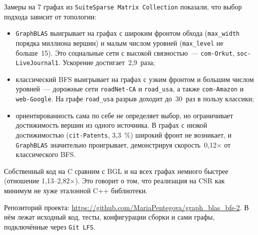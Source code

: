 \documentclass[a4paper]{article}
\begin{document}
Замеры на 7 графах из \texttt{SuiteSparse Matrix Collection} показали, что выбор подхода зависит от топологии:
\begin{itemize}
    \item \texttt{GraphBLAS} выигрывает на графах с широким фронтом обхода (\texttt{max\_width} порядка миллиона вершин) и малым числом уровней (\texttt{max\_level} не больше~15). Это социальные сети с высокой связностью~--- \texttt{com-Orkut}, \texttt{soc-LiveJournal1}. Ускорение достигает~2,9~раза;
    \item классический BFS выигрывает на графах с узким фронтом и большим числом уровней~--- дорожные сети \texttt{roadNet-CA} и \texttt{road\_usa}, а также \texttt{com-Amazon} и \texttt{web-Google}. На графе \texttt{road\_usa} разрыв доходит до~30~раз в пользу классики;
    \item ориентированность сама по себе не определяет выбор, но ограничивает достижимость вершин из одного источника. В графах с низкой достижимостью (\texttt{cit-Patents}, 3,3~{\%}) широкий фронт не возникает, и \texttt{GraphBLAS} значительно проигрывает, демонстрируя скорость~0,12$\times$ от классического BFS.
\end{itemize}

Собственный код на C сравним с BGL и на всех графах немного быстрее (отношение 1,13--2,82$\times$). Это говорит о том, что реализация на CSR как минимум не хуже эталонной C++ библиотеки.

Репозиторий проекта: \url{https://github.com/MariaPentegova/graph_blas_bfs-2}. В нём лежат исходный код, тесты, конфигурации сборки и сами графы, подключённые через \texttt{Git LFS}.
\end{document}
